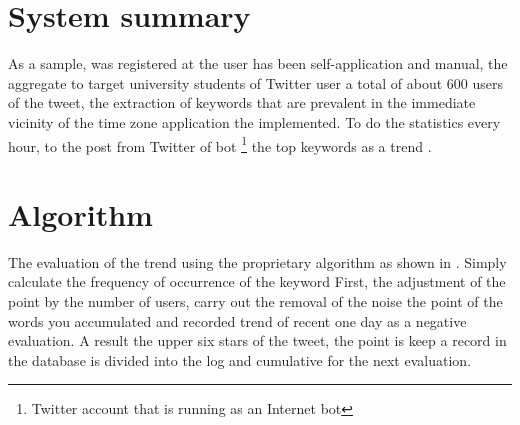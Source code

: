 \section{System summary}
As a sample, was registered at the user has been self-application and manual, the aggregate to target university students of Twitter user a total of about 600 users of the tweet, the extraction of keywords that are prevalent in the immediate vicinity of the time zone application the implemented. To do the statistics every hour, to the post from Twitter of bot \footnote{Twitter account that is running as an Internet bot} the top keywords as a trend \cite{tdu_trend}.


\section{Algorithm}
The evaluation of the trend using the proprietary algorithm as shown in . Simply calculate the frequency of occurrence of the keyword First, the adjustment of the point by the number of users, carry out the removal of the noise the point of the words you accumulated and recorded trend of recent one day as a negative evaluation. A result the upper six stars of the tweet, the point is keep a record in the database is divided into the log and cumulative for the next evaluation.

